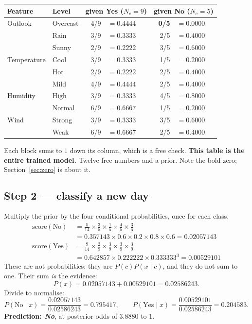 \documentclass[11pt]{article}
\begin{document}
\begin{center}\small
\begin{tabular}{@{}llrlrl@{}}
\toprule
\textbf{Feature} & \textbf{Level} & \multicolumn{2}{c}{\textbf{given Yes}
  ($N_c = 9$)} & \multicolumn{2}{c}{\textbf{given No} ($N_c = 5$)}\\
\midrule
Outlook & Overcast & 4/9 & $=0.4444$ & \textbf{0/5} & $=\mathbf{0.0000}$\\
        & Rain     & 3/9 & $=0.3333$ & 2/5 & $=0.4000$\\
        & Sunny    & 2/9 & $=0.2222$ & 3/5 & $=0.6000$\\
\midrule
Temperature & Cool & 3/9 & $=0.3333$ & 1/5 & $=0.2000$\\
            & Hot  & 2/9 & $=0.2222$ & 2/5 & $=0.4000$\\
            & Mild & 4/9 & $=0.4444$ & 2/5 & $=0.4000$\\
\midrule
Humidity & High   & 3/9 & $=0.3333$ & 4/5 & $=0.8000$\\
         & Normal & 6/9 & $=0.6667$ & 1/5 & $=0.2000$\\
\midrule
Wind & Strong & 3/9 & $=0.3333$ & 3/5 & $=0.6000$\\
     & Weak   & 6/9 & $=0.6667$ & 2/5 & $=0.4000$\\
\bottomrule
\end{tabular}
\end{center}

Each block sums to $1$ down its column, which is a free check. \textbf{This
table is the entire trained model.} Twelve free numbers and a prior. Note the
bold zero; Section~\ref{sec:zero} is about it.

\subsection{Step 2 --- classify a new day}

\begin{worked}[$x = (\text{Sunny}, \text{Cool}, \text{High},
\text{Strong})$]
Multiply the prior by the four conditional probabilities, once for each
class.
\begin{align*}
  \text{score}(\text{No})
    &= \tfrac{5}{14} \times \tfrac{3}{5} \times \tfrac{1}{5}
       \times \tfrac{4}{5} \times \tfrac{3}{5}\\
    &= 0.357143 \times 0.6 \times 0.2 \times 0.8 \times 0.6
     = \mathbf{0.02057143}\\[0.4em]
  \text{score}(\text{Yes})
    &= \tfrac{9}{14} \times \tfrac{2}{9} \times \tfrac{3}{9}
       \times \tfrac{3}{9} \times \tfrac{3}{9}\\
    &= 0.642857 \times 0.222222 \times 0.333333^{3}
     = \mathbf{0.00529101}
\end{align*}
These are not probabilities: they are $P(c)P(x \mid c)$, and they do not sum
to one. Their sum \emph{is} the evidence:
\[
  P(x) = 0.02057143 + 0.00529101 = 0.02586243 .
\]
Divide to normalise:
\[
  P(\text{No} \mid x) = \frac{0.02057143}{0.02586243} = \mathbf{0.795417},
  \qquad
  P(\text{Yes} \mid x) = \frac{0.00529101}{0.02586243} = \mathbf{0.204583}.
\]
\textbf{Prediction: \emph{No}}, at posterior odds of $3.8880$ to $1$.
\end{worked}
\end{document}
